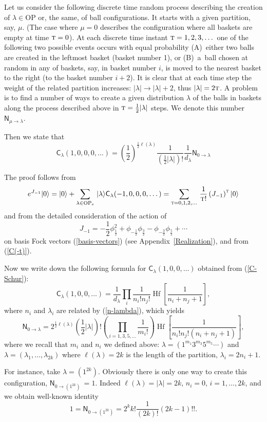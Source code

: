 \documentclass[pdftex]{sigma}
\numberwithin{equation}{section}
\newcommand{\Hf}{\mathop\mathrm{Hf}\nolimits}
\newcommand{\C}{\textsf{C}_}
\renewcommand{\r}{\rangle}
\begin{document}
Let us consider the following discrete time random process
describing the creation of  $\lambda\in\mathrm{OP}$ or, the same,  of ball
conf\/igurations.  It starts with a given partition, say, $\mu$.
(The case where $\mu=0$ describes the conf\/iguration where all
baskets are empty  at time ${\textsc t}=0$). At each discrete time
instant ${\textsc t}=1,2,3,\dots$ one of the following  two possible events
occurs with equal probability (A)~either two balls are created in
the leftmost basket (basket number 1), or (B)~a~ball chosen at
random in any of baskets, say, in basket number $i$, is moved to
the nearest basket to the right (to the basket number $i+2$). It
is clear that at each time  step the weight of the related
partition increases: $|\lambda|\to |\lambda|+2$, thus
$|\lambda|=2{\textsc t}$.
 A problem is to f\/ind a number of ways to create a given
distribution $\lambda$ of the balls in baskets along the process
described above in ${\textsc t}=\frac 12|\lambda|$ steps. We
denote this number  $ \textsf{N}_{\mu\to\lambda}$.

Then we state that
\[
\C\lambda(1,0,0,0,\dots)=\left(\frac 12 \right)^{\frac
12\ell(\lambda)} \frac{1}{\left(\frac12 |\lambda|\right)!}
\frac{1}{d_\lambda} \textsf{N}_{0\to\lambda}
\]


The proof follows from
 \[
e^{J_{-1}}|0\r =|0\r+ \sum_{\lambda\in\rm OP_e}\,|\lambda
\r\C\lambda(-1,0,0,0,\dots)=\sum_{{\textsc
t}=0,1,2,\dots}\,\frac{1}{{\textsc t}!}\left(
J_{-1}\right)^{\textsc t}|0\r
 \]
and from the detailed consideration of the action of
  \[
J_{-1}=-\frac 12 \phi_{\frac 12}^2 +\phi_{-\frac 12}\phi_{\frac
32}-\phi_{-\frac 32}\phi_{\frac 52}+\cdots
 \]
 on
basis Fock vectors (\ref{basis-vectors}) (see Appendix~\ref{Realization}), and from (\ref{C(-t)}).

Now we write down the following formula for
$\C\lambda(1,0,0,\dots)$ obtained from (\ref{C-Schur}):
 \[
\C\lambda(1,0,0,\dots)= \frac{1}{d_\lambda} \prod_{i}\frac
1{n_i!n_j!}\Hf\left[ \frac{1}{n_i+n_j+1} \right],
 \]
where $n_i$ and $\lambda_i$ are related by (\ref{n-lambda}), which
yields
\[
\textsf{N}_{0\to\lambda}= 2^{\frac 12
\ell(\lambda)} \left(\frac 12
|\lambda|\right)! \left(\prod_{i=1,3,5,\dots} \frac{1}{m_i!}\right) \Hf\left[
\frac{1}{n_i!n_j!(n_i+n_j+1)} \right],
\]
 where we recall that $m_i$ and $n_i$ we def\/ined above:
 $\lambda=(1^{m_1}3^{m_3}5^{m_5}\cdots)$ and
 $\lambda=(\lambda_1,\dots,\lambda_{2k})$ where $\ell(\lambda)=2k$ is the length of
 the partition,
 $\lambda_i=2n_i+1$.

 For instance, take $\lambda=(1^{2k})$. Obviously there is only one
 way to create this conf\/iguration, $\textsf{N}_{0\to (1^{2k})}\,=1$. Indeed
 $\ell(\lambda)=|\lambda|=2k$, $n_i=0$,
 $i=1,\dots,2k$, and we obtain well-known identity
  \[
1 = \textsf{N}_{0\to(1^{2k})} = 2^k k! \frac{1}{(2k)!} (2k-1)!!.
  \]
\end{document}
